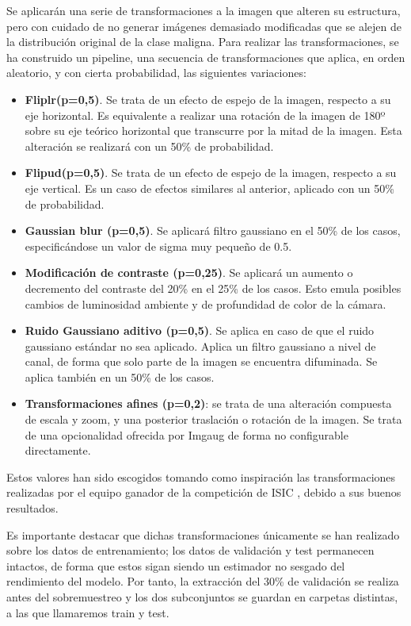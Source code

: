 Se aplicarán una serie de transformaciones a la imagen que alteren su estructura, pero con cuidado de no generar imágenes demasiado modificadas que se alejen de la distribución original de la clase maligna. Para realizar las transformaciones, se ha construido un pipeline, una secuencia de transformaciones que aplica, en orden aleatorio, y con cierta probabilidad, las siguientes variaciones:

\begin{itemize}
	\item \textbf{Fliplr(p=0,5)}. Se trata de un efecto de espejo de la imagen, respecto a su eje horizontal. Es equivalente a realizar una rotación de la imagen de 180º sobre su eje teórico horizontal que transcurre por la mitad de la imagen. Esta alteración se realizará con un 50\% de probabilidad.
	\item \textbf{Flipud(p=0,5)}. Se trata de un efecto de espejo de la imagen, respecto a su eje vertical. Es un caso de efectos similares al anterior, aplicado con un 50\% de probabilidad.
	\item \textbf{Gaussian blur (p=0,5)}. Se aplicará filtro gaussiano en el 50\% de los casos, especificándose un valor de sigma muy pequeño de 0.5.
	\item \textbf{Modificación de contraste  (p=0,25)}. Se aplicará un aumento o decremento del contraste del 20\% en el 25\% de los casos. Esto emula posibles cambios de luminosidad ambiente y de profundidad de color de la cámara.
	\item \textbf{Ruido Gaussiano aditivo  (p=0,5)}. Se aplica en caso de que el ruido gaussiano estándar no sea aplicado. Aplica un filtro gaussiano a nivel de canal, de forma que solo parte de la imagen se encuentra difuminada.  Se aplica también en un 50\% de los casos.
	\item \textbf{Transformaciones afines  (p=0,2)}: se trata de una alteración compuesta de escala y zoom, y una posterior traslación o rotación de la imagen. Se trata de una opcionalidad ofrecida por Imgaug de forma no configurable directamente.
\end{itemize}

Estos valores han sido escogidos tomando como inspiración las transformaciones realizadas por el equipo ganador de la competición de ISIC \cite{1stISIC}, debido a sus buenos resultados.

Es importante destacar que dichas transformaciones únicamente se han realizado sobre los datos de entrenamiento; los datos de validación y test permanecen intactos, de forma que estos sigan siendo un estimador no sesgado del rendimiento del modelo. Por tanto, la extracción del 30\% de validación se realiza antes del sobremuestreo y los dos subconjuntos se guardan en carpetas distintas, a las que llamaremos train y test.

